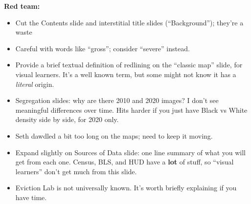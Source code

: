 \documentclass[12pt,pdftex,letterpaper]{article}
\begin{document}
\vspace{0.5cm}

\noindent \textbf{Red team:}
\begin{itemize}
	\item Cut the Contents slide and interstitial title slides (``Background''); they're a waste
	
	\item Careful with words like ``gross''; consider ``severe'' instead.
	
	\item Provide a brief textual definition of redlining on the ``classic map'' slide, for visual learners. It's a well known term, but some might not know it has a \textit{literal} origin.
	
	\item Segregation slides: why are there 2010 and 2020 images? I don't see meaningful differences over time. Hits harder if you just have Black vs White density side by side, for 2020 only.
	
	\item Seth dawdled a bit too long on the maps; need to keep it moving.
	
	\item Expand slightly on Sources of Data slide: one line summary of what you will get from each one. Census, BLS, and HUD have a \textbf{lot} of stuff, so ``visual learners'' don't get much from this slide.
	
	\item Eviction Lab is not universally known. It's worth briefly explaining if you have time.
\end{itemize}


\vspace{0.5cm}
\end{document}
